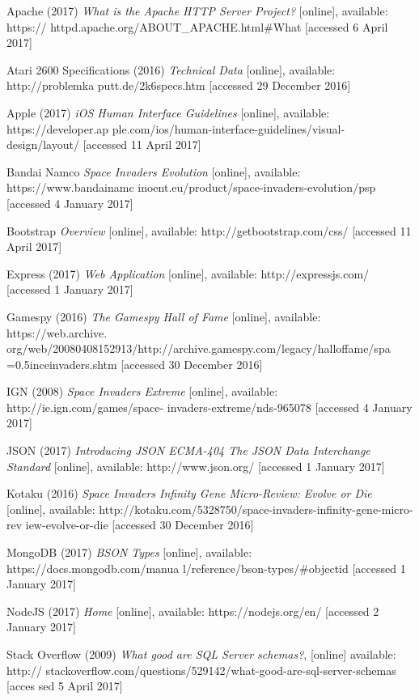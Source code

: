 \documentclass[12pt]{article}
\begin{document}
Apache (2017) \textit{What is the Apache HTTP Server Project?} [online], available: https://
\hangindent=0.5in httpd.apache.org/ABOUT{\_}APACHE.html{\#}What [accessed 6 April 2017]

Atari 2600 Specifications (2016) \textit{Technical Data} [online], available: http://problemka
\hangindent=0.5in putt.de/2k6specs.htm [accessed 29 December 2016]

Apple (2017) \textit{iOS Human Interface Guidelines} [online], available: https://developer.ap
\hangindent=0.5in ple.com/ios/human-interface-guidelines/visual-design/layout/ [accessed 11 April 2017]

Bandai Namco \textit{Space Invaders Evolution} [online], available:
https://www.bandainamc
 inoent.eu/product/space-invaders-evolution/psp [accessed
4 January 2017]

Bootstrap \textit{Overview} [online], available: http://getbootstrap.com/css/ [accessed 11\hangindent=0.5in April 2017]

Express (2017) \textit{Web Application} [online], available: http://expressjs.com/ [accessed 
\hangindent=0.5in 1 January 2017]

Gamespy (2016) \textit{The Gamespy Hall of Fame} [online], available: https://web.archive.
\hangindent=0.5in org/web/20080408152913/http://archive.gamespy.com/legacy/halloffame/spa
\hangindent=0.5inceinvaders.shtm [accessed 30 December 2016]

IGN (2008) \textit{Space Invaders Extreme} [online], available: http://ie.ign.com/games/space-
\hangindent=0.5in invaders-extreme/nds-965078 [accessed 4 January 2017]

JSON (2017) \textit{Introducing JSON ECMA-404 The JSON Data Interchange Standard} [online], available: \hangindent=0.5in http://www.json.org/ [accessed 1 January 2017]

Kotaku (2016) \textit{Space Invaders Infinity Gene Micro-Review: Evolve or Die} [online], 
\hangindent=0.5in available: http://kotaku.com/5328750/space-invaders-infinity-gene-micro-rev
\hangindent=0.5in iew-evolve-or-die [accessed 30 December 2016]

MongoDB (2017) \textit{BSON Types} [online], available: https://docs.mongodb.com/manua
\hangindent=0.5in l/reference/bson-types/{\#}objectid [accessed 1 January 2017]

NodeJS (2017) \textit{Home} [online], available: https://nodejs.org/en/ [accessed 2 January 
\hangindent=0.5in 2017]

Stack Overflow (2009) \textit{What good are SQL Server schemas?}, [online] available: http://
\hangindent=0.5in stackoverflow.com/questions/529142/what-good-are-sql-server-schemas [acces
\hangindent=0.5in sed 5 April 2017]
\end{document}
